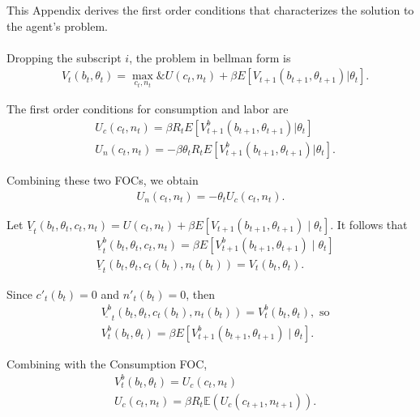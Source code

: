 \documentclass[../CGMPortfolio.tex]{subfiles}
\begin{document}
This Appendix derives the first order conditions that characterizes the solution to the agent's problem.
\\
\\
Dropping the subscript $i$, the problem in bellman form is 
\begin{align*}
    &V_{t}(b_{t}, \theta_{t}) = \max _{c_{t}, n_{t}} \& U(c_{t}, n_{t})+\beta E[V_{t+1}(b_{t+1}, \theta_{t+1}) | \theta_{t}].
\end{align*}

The first order conditions for consumption and labor are 
\begin{align*}
&U_{c}(c_{t},n_{t}) = \beta R_{t} E[{V^{b}_{t+1}}(b_{t+1},\theta_{t+1})|\theta_{t}] \\
&U_{n}(c_{t},n_{t}) = -\beta \theta_{t} R_{t} E[{V^{b}_{t+1}}(b_{t+1},\theta_{t+1})|\theta_{t}].
\end{align*}

Combining these two FOCs, we obtain 
\begin{align*}
    U_{n}(c_{t},n_{t})= - \theta_{t} U_{c}(c_{t},n_{t}).
\end{align*}




Let $\underline{V}_{t}\left(b_{t}, \theta_{t}, c_{t}, n_{t}\right)=U\left(c_{t}, n_{t}\right)+\beta E\left[V_{t+1}\left(b_{t+1}, \theta_{t+1}\right) \mid \theta_{t}\right]$. It follows that
\begin{align*}
    &\underline{V}_{t}^{b}\left(b_{t}, \theta_{t}, c_{t}, n_{t}\right)=\beta E\left[V_{t+1}^{b}\left(b_{t+1}, \theta_{t+1}\right) \mid \theta_{t}\right]\\
    &\underline{V}_{t}\left(b_{t}, \theta_{t}, c_{t}\left(b_{t}\right), n_{t}\left(b_{t}\right)\right)=V_{t}\left(b_{t}, \theta_{t}\right).
\end{align*}

Since $c'_{t}(b_{t})=0$ and $n'_{t}(b_{t})=0$, then 
\begin{align*}
    &\underline{V^{b}}_{t}(b_{t}, \theta_{t} , c_{t}(b_{t}) , n_{t}(b_{t})) = V^{b}_{t}(b_{t}, \theta_{t}), \text{ so} \\
    &V^{b}_{t}(b_{t}, \theta_{t})=  \beta E\left[V_{t+1}^{b}\left(b_{t+1}, \theta_{t+1}\right) \mid \theta_{t}\right].
\end{align*}

Combining with the Consumption FOC,
\begin{align*}
    &V^{b}_{t}(b_{t}, \theta_{t}) = U_{c}(c_{t},n_{t}) \\
    &U_{c}(c_{t},n_{t}) = \beta R_{t} \mathbb{E} \left( U_{c}(c_{t+1},n_{t+1}) \right).
\end{align*}
\end{document}
